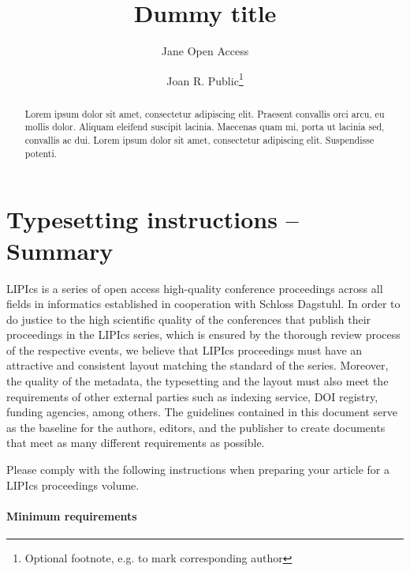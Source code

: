 \documentclass[a4paper,UKenglish,cleveref, autoref, thm-restate, anonymous]{lipics-v2021}
\title{Dummy title} %
\author{Jane {Open Access}}{Dummy University Computing Laboratory, [optional: Address], Country \and My second affiliation, Country \and \url{http://www.myhomepage.edu} }{johnqpublic@dummyuni.org}{https://orcid.org/0000-0002-1825-0097}{(Optional) author-specific funding acknowledgements}%
\author{Joan R. Public\footnote{Optional footnote, e.g. to mark corresponding author}}{Department of Informatics, Dummy College, [optional: Address], Country}{joanrpublic@dummycollege.org}{[orcid]}{[funding]}
\begin{document}
\maketitle

\begin{abstract}
Lorem ipsum dolor sit amet, consectetur adipiscing elit. Praesent convallis orci arcu, eu mollis dolor. Aliquam eleifend suscipit lacinia. Maecenas quam mi, porta ut lacinia sed, convallis ac dui. Lorem ipsum dolor sit amet, consectetur adipiscing elit. Suspendisse potenti. 
\end{abstract}

\section{Typesetting instructions -- Summary}
\label{sec:typesetting-summary}

LIPIcs is a series of open access high-quality conference proceedings across all fields in informatics established in cooperation with Schloss Dagstuhl. 
In order to do justice to the high scientific quality of the conferences that publish their proceedings in the LIPIcs series, which is ensured by the thorough review process of the respective events, we believe that LIPIcs proceedings must have an attractive and consistent layout matching the standard of the series.
Moreover, the quality of the metadata, the typesetting and the layout must also meet the requirements of other external parties such as indexing service, DOI registry, funding agencies, among others. The guidelines contained in this document serve as the baseline for the authors, editors, and the publisher to create documents that meet as many different requirements as possible. 

Please comply with the following instructions when preparing your article for a LIPIcs proceedings volume. 
\paragraph*{Minimum requirements}
\end{document}
